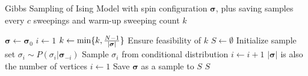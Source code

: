 \documentclass{article}
\begin{document}
\begin{algorithm}
    \caption{Gibbs Sampling of Ising Model with spin configuration $\boldsymbol{\sigma}$, plus saving samples every $c$ sweepings and warm-up sweeping count $k$}
\begin{algorithmic}[1]
    \State $\boldsymbol\sigma \gets \boldsymbol\sigma_0$
    \State $i \gets 1$
    \State $k \gets \min\{k, {N - 1\over |\boldsymbol\sigma|}\}$ \Comment Ensure feasibility of $k$
    \State $S\gets \emptyset$ \Comment Initialize sample set
    \State $\sigma_i \sim P(\sigma_i|\boldsymbol\sigma_{-i})$ \Comment Sample $\sigma_i$ from conditional distribution
    \State $i \gets i + 1$
     \Comment $|\boldsymbol\sigma|$ is also the number of vertices
    \State $i \gets 1$
    \EndIf
    \State Save $\boldsymbol\sigma$ as a sample to $S$
    \EndIf
    \EndFor
    \State \Return $S$
    \EndFunction
\end{algorithmic}
\end{algorithm}
\end{document}

